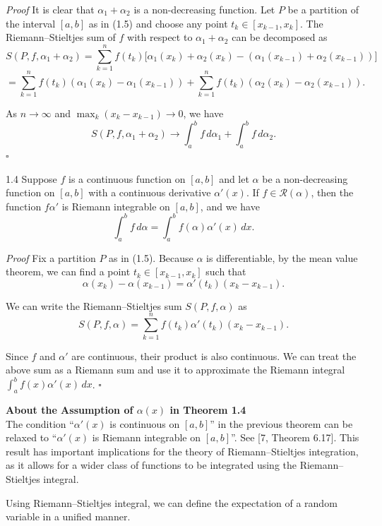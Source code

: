 \textit{Proof} It is clear that $\alpha_1+\alpha_2$ is a non-decreasing function. Let $P$ be a partition of the interval $[a,b]$ as in (1.5) and choose any point $t_k \in [x_{k-1},x_k]$. The Riemann--Stieltjes sum of $f$ with respect to $\alpha_1+\alpha_2$ can be decomposed as
\[
S(P,f,\alpha_1+\alpha_2)
=
\sum_{k=1}^{n} f(t_k)\bigl[\alpha_1(x_k)+\alpha_2(x_k)-(\alpha_1(x_{k-1})+\alpha_2(x_{k-1}))\bigr]
\]
\[
=
\sum_{k=1}^{n} f(t_k)(\alpha_1(x_k)-\alpha_1(x_{k-1}))
+
\sum_{k=1}^{n} f(t_k)(\alpha_2(x_k)-\alpha_2(x_{k-1})).
\]

As $n\to \infty$ and $\max_k (x_k-x_{k-1})\to 0$, we have
\[
S(P,f,\alpha_1+\alpha_2)\to \int_a^b f\, d\alpha_1+\int_a^b f\, d\alpha_2.
\]
\hfill $\square$

\begin{thmbox}{1.4}
Suppose $f$ is a continuous function on $[a,b]$ and let $\alpha$ be a non-decreasing function on $[a,b]$ with a continuous derivative $\alpha'(x)$. If $f \in \mathcal{R}(\alpha)$, then the function $f\alpha'$ is Riemann integrable on $[a,b]$, and we have
\[
\int_a^b f\, d\alpha = \int_a^b f(\alpha)\alpha'(x)\, dx.
\]
\end{thmbox}

\textit{Proof} Fix a partition $P$ as in (1.5). Because $\alpha$ is differentiable, by the mean value theorem, we can find a point $t_k \in [x_{k-1},x_k]$ such that
\[
\alpha(x_k)-\alpha(x_{k-1})=\alpha'(t_k)(x_k-x_{k-1}).
\]

We can write the Riemann--Stieltjes sum $S(P,f,\alpha)$ as
\[
S(P,f,\alpha)=\sum_{k=1}^{n} f(t_k)\alpha'(t_k)(x_k-x_{k-1}).
\]

Since $f$ and $\alpha'$ are continuous, their product is also continuous. We can treat the above sum as a Riemann sum and use it to approximate the Riemann integral $\int_a^b f(x)\alpha'(x)\, dx$. \hfill $\square$

\textbf{About the Assumption of $\alpha(x)$ in Theorem 1.4} \\
The condition ``$\alpha'(x)$ is continuous on $[a,b]$'' in the previous theorem can be relaxed to ``$\alpha'(x)$ is Riemann integrable on $[a,b]$''. See [7, Theorem 6.17]. This result has important implications for the theory of Riemann--Stieltjes integration, as it allows for a wider class of functions to be integrated using the Riemann--Stieltjes integral.

Using Riemann--Stieltjes integral, we can define the expectation of a random variable in a unified manner.

